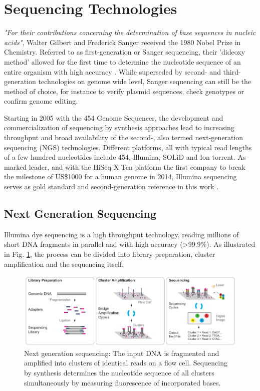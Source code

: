 \section{Sequencing Technologies}
\label{sec:intro:sequencing}

\textit{"For their contributions concerning the determination of base sequences in nucleic acids"}, Walter Gilbert and Frederick Sanger received the 1980 Nobel Prize in Chemistry.
Referred to as first-generation or Sanger sequencing, their 'dideoxy method' allowed for the first time to determine the nucleotide sequence of an entire organism with high accuracy \cite{Sanger1977}.
While superseded by second- and third-generation technologies on genome wide level, Sanger sequencing can still be the method of choice, for instance to verify plasmid sequences, check genotypes or confirm genome editing.

Starting in 2005 with the 454 Genome Sequencer, the development and commercialization of sequencing by synthesis approaches lead to increasing throughput and broad availability of the second-, also termed next-generation sequencing (NGS) technologies.
Different platforms, all with typical read lengths of a few hundred nucleotides include 454, Illumina, SOLiD and Ion torrent.
As marked leader, and with the HiSeq X Ten platform the first company to break the milestone of US\$1000 for a human genome in 2014, Illumina sequencing serves as gold standard and second-generation reference in this work \cite{Dijk2014}.

\subsection{Next Generation Sequencing}
\label{subsec:intro:ngs}

Illumina dye sequencing is a high throughput technology, reading millions of short DNA fragments in parallel and with high accuracy (>99.9\%).
As illustrated in Fig. \ref{fig:intro:sbs}, the process can be divided into library preparation, cluster amplification and the sequencing itself.

\begin{figure}[h]
	\centering
	\includegraphics[width=1.0\textwidth]{figures/intro/sbs.pdf}
	\captionsetup{format=plain}
	\caption[Sequencing by synthesis]{Next generation sequencing: The input DNA is fragmented and amplified into clusters of identical reads on a flow cell. Sequencing by synthesis determines the nucleotide sequence of all clusters simultaneously by measuring fluorescence of incorporated bases.}
	\label{fig:intro:sbs}
\end{figure}

